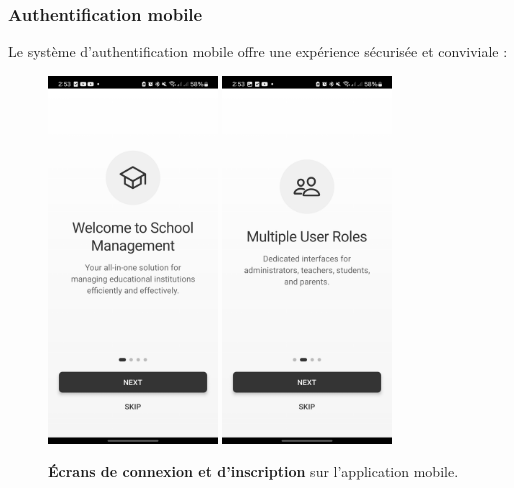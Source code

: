 \subsubsection{Authentification mobile}

Le système d'authentification mobile offre une expérience sécurisée et conviviale :

\begin{figure}[H]
  \centering
  \includegraphics[width=0.4\textwidth,keepaspectratio]{pfe-pics/Mobile /Auth/Screenshot_20250610_145348_Expo Go.jpg}
  \includegraphics[width=0.4\textwidth,keepaspectratio]{pfe-pics/Mobile /Auth/Screenshot_20250610_145354_Expo Go.jpg}
  \caption{\textbf{Écrans de connexion et d'inscription} sur l'application mobile.}
  \label{fig:mobile_auth_screens}
\end{figure}

